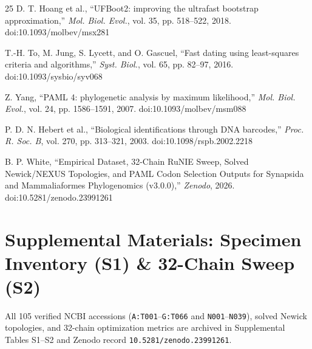\documentclass[10pt,letterpaper]{article}
\begin{document}
\begin{thebibliography}{25}
D. T. Hoang et al., ``UFBoot2: improving the ultrafast bootstrap approximation,'' \emph{Mol. Biol. Evol.}, vol. 35, pp. 518--522, 2018. doi:10.1093/molbev/msx281

T.-H. To, M. Jung, S. Lycett, and O. Gascuel, ``Fast dating using least-squares criteria and algorithms,'' \emph{Syst. Biol.}, vol. 65, pp. 82--97, 2016. doi:10.1093/sysbio/syv068

Z. Yang, ``PAML 4: phylogenetic analysis by maximum likelihood,'' \emph{Mol. Biol. Evol.}, vol. 24, pp. 1586--1591, 2007. doi:10.1093/molbev/msm088

P. D. N. Hebert et al., ``Biological identifications through DNA barcodes,'' \emph{Proc. R. Soc. B}, vol. 270, pp. 313--321, 2003. doi:10.1098/rspb.2002.2218

B. P. White, ``Empirical Dataset, 32-Chain RuNIE Sweep, Solved Newick/NEXUS Topologies, and PAML Codon Selection Outputs for Synapsida and Mammaliaformes Phylogenomics (v3.0.0),'' \emph{Zenodo}, 2026. doi:10.5281/zenodo.23991261

\end{thebibliography}

\section{Supplemental Materials: Specimen Inventory (S1) \& 32-Chain Sweep (S2)}
All 105 verified NCBI accessions (\texttt{A:T001}--\texttt{G:T066} and \texttt{N001}--\texttt{N039}), solved Newick topologies, and 32-chain optimization metrics are archived in Supplemental Tables S1--S2 and Zenodo record \texttt{10.5281/zenodo.23991261}.
\end{document}
